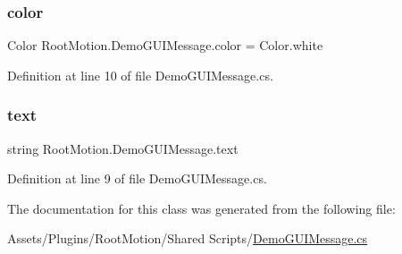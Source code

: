 \subsubsection{\texorpdfstring{color}{color}}
{\footnotesize\ttfamily Color Root\+Motion.\+Demo\+G\+U\+I\+Message.\+color = Color.\+white}



Definition at line 10 of file Demo\+G\+U\+I\+Message.\+cs.

\mbox{\label{class_root_motion_1_1_demo_g_u_i_message_aaedb46359c656929d96a8e1b76a17065}} 
\subsubsection{\texorpdfstring{text}{text}}
{\footnotesize\ttfamily string Root\+Motion.\+Demo\+G\+U\+I\+Message.\+text}



Definition at line 9 of file Demo\+G\+U\+I\+Message.\+cs.



The documentation for this class was generated from the following file\+:\begin{DoxyCompactItemize}
\item 
Assets/\+Plugins/\+Root\+Motion/\+Shared Scripts/\mbox{\hyperlink{_demo_g_u_i_message_8cs}{Demo\+G\+U\+I\+Message.\+cs}}\end{DoxyCompactItemize}
